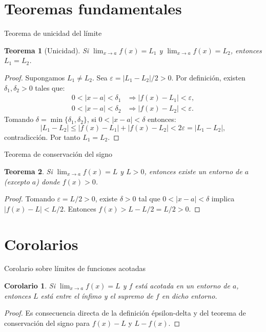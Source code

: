 \documentclass[10pt, spanish]{beamer}
\newtheorem{teorema}{Teorema}
\newtheorem{corolario}{Corolario}
\begin{document}
	\section{Teoremas fundamentales}
	\begin{frame}{Teorema de unicidad del límite}
		\begin{teorema}[Unicidad]
			Si $\displaystyle \lim_{x\to a} f(x) = L_1$ y $\displaystyle \lim_{x\to a} f(x) = L_2$, entonces $L_1 = L_2$.
		\end{teorema}
		\begin{proof}
			Supongamos $L_1 \neq L_2$. Sea $\varepsilon = |L_1 - L_2|/2 > 0$. Por definición, existen $\delta_1, \delta_2 > 0$ tales que:
			\begin{align*}
				0<|x-a|<\delta_1 &\Rightarrow |f(x)-L_1| < \varepsilon,\\
				0<|x-a|<\delta_2 &\Rightarrow |f(x)-L_2| < \varepsilon.
			\end{align*}
			Tomando $\delta = \min\{\delta_1, \delta_2\}$, si $0<|x-a|<\delta$ entonces:
			\[
			|L_1-L_2| \le |f(x)-L_1| + |f(x)-L_2| < 2\varepsilon = |L_1-L_2|,
			\]
			contradicción. Por tanto $L_1 = L_2$.
		\end{proof}
	\end{frame}
	
	\begin{frame}{Teorema de conservación del signo}
		\begin{teorema}
			Si $\displaystyle \lim_{x\to a} f(x) = L$ y $L > 0$, entonces existe un entorno de $a$ (excepto $a$) donde $f(x) > 0$.
		\end{teorema}
		\begin{proof}
			Tomando $\varepsilon = L/2 > 0$, existe $\delta > 0$ tal que $0<|x-a|<\delta$ implica $|f(x)-L| < L/2$. Entonces $f(x) > L - L/2 = L/2 > 0$.
		\end{proof}
	\end{frame}
	
	\section{Corolarios}
	\begin{frame}{Corolario sobre límites de funciones acotadas}
		\begin{corolario}
			Si $\displaystyle \lim_{x\to a} f(x) = L$ y $f$ está acotada en un entorno de $a$, entonces $L$ está entre el ínfimo y el supremo de $f$ en dicho entorno.
		\end{corolario}
		\begin{proof}
			Es consecuencia directa de la definición épsilon-delta y del teorema de conservación del signo para $f(x)-L$ y $L-f(x)$.
		\end{proof}
	\end{frame}
	
\end{document}
